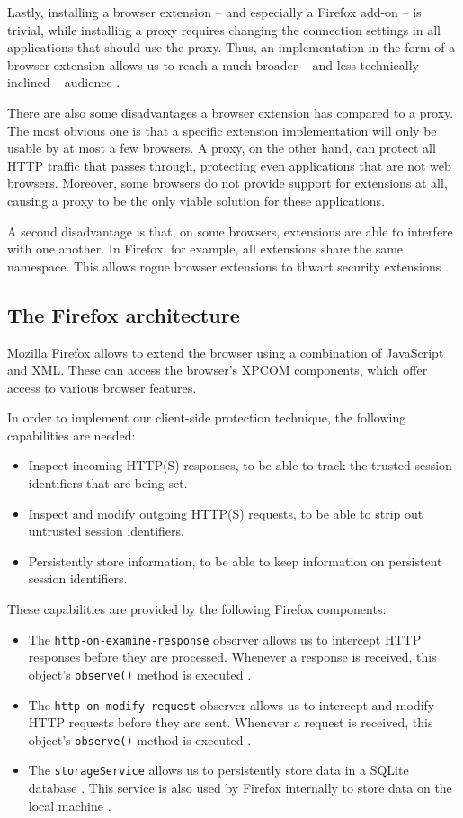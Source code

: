 Lastly, installing a browser extension -- and especially a Firefox add-on -- is trivial, while installing a proxy requires changing the connection settings in all applications that should use the proxy. Thus, an implementation in the form of a browser extension allows us to reach a much broader -- and less technically inclined -- audience \cite{Bonne2011}.

There are also some disadvantages a browser extension has compared to a proxy. The most obvious one is that a specific extension implementation will only be usable by at most a few browsers. A proxy, on the other hand, can protect all HTTP traffic that passes through, protecting even applications that are not web browsers. Moreover, some browsers do not provide support for extensions at all, causing a proxy to be the only viable solution for these applications.

A second disadvantage is that, on some browsers, extensions are able to interfere with one another. In Firefox, for example, all extensions share the same namespace. This allows rogue browser extensions to thwart security extensions \cite{Barth2010,TerLouw2007}.

\subsection{The Firefox architecture}

Mozilla Firefox allows to extend the browser using a combination of JavaScript and XML. These can access the browser's XPCOM components, which offer access to various browser features.

In order to implement our client-side protection technique, the following capabilities are needed:
\begin{itemize}
	\item Inspect incoming HTTP(S) responses, to be able to track the trusted session identifiers that are being set.
	\item Inspect and modify outgoing HTTP(S) requests, to be able to strip out untrusted session identifiers.
	\item Persistently store information, to be able to keep information on persistent session identifiers.
\end{itemize}
These capabilities are provided by the following Firefox components:
\begin{itemize}
	\item The \texttt{http-on-examine-response} observer allows us to intercept HTTP responses before they are processed. Whenever a response is received, this object's \texttt{observe()} method is executed \cite{MozillaObservers}.
	\item The \texttt{http-on-modify-request} observer allows us to intercept and modify HTTP requests before they are sent. Whenever a request is received, this object's \texttt{observe()} method is executed \cite{MozillaObservers}.
	\item The \texttt{storageService} allows us to persistently store data in a SQLite database \cite{MozillaStorage}. This service is also used by Firefox internally to store data on the local machine \cite{Bonne2011,MozillaStorage}.
\end{itemize}

